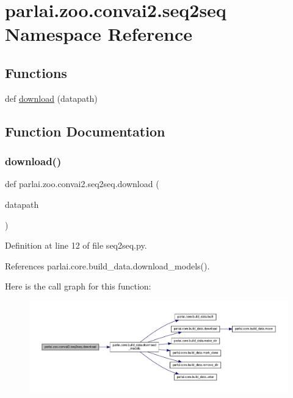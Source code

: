 \hypertarget{namespaceparlai_1_1zoo_1_1convai2_1_1seq2seq}{}\section{parlai.\+zoo.\+convai2.\+seq2seq Namespace Reference}
\label{namespaceparlai_1_1zoo_1_1convai2_1_1seq2seq}
\subsection*{Functions}
\begin{DoxyCompactItemize}
\item 
def \hyperlink{namespaceparlai_1_1zoo_1_1convai2_1_1seq2seq_a85645a8dbd4e8a3d67f8acb231de4f6b}{download} (datapath)
\end{DoxyCompactItemize}


\subsection{Function Documentation}
\mbox{\label{namespaceparlai_1_1zoo_1_1convai2_1_1seq2seq_a85645a8dbd4e8a3d67f8acb231de4f6b}} 
\subsubsection{\texorpdfstring{download()}{download()}}
{\footnotesize\ttfamily def parlai.\+zoo.\+convai2.\+seq2seq.\+download (\begin{DoxyParamCaption}\item[{}]{datapath }\end{DoxyParamCaption})}



Definition at line 12 of file seq2seq.\+py.



References parlai.\+core.\+build\+\_\+data.\+download\+\_\+models().

Here is the call graph for this function\+:
\nopagebreak
\begin{figure}[H]
\begin{center}
\leavevmode
\includegraphics[width=350pt]{namespaceparlai_1_1zoo_1_1convai2_1_1seq2seq_a85645a8dbd4e8a3d67f8acb231de4f6b_cgraph}
\end{center}
\end{figure}
